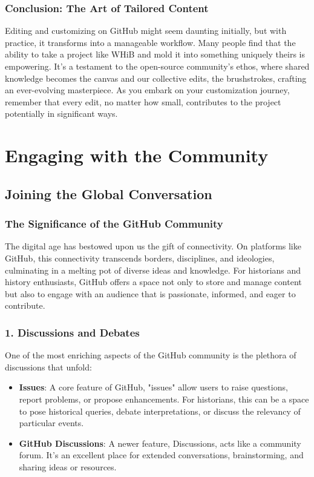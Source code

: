 \documentclass{book}
\begin{document}
\subsection*{Conclusion: The Art of Tailored Content}
Editing and customizing on GitHub might seem daunting initially, but with practice, it transforms into a manageable workflow. Many people find that the ability to take a project like WHiB and mold it into something uniquely theirs is empowering. It's a testament to the open-source community's ethos, where shared knowledge becomes the canvas and our collective edits, the brushstrokes, crafting an ever-evolving masterpiece. As you embark on your customization journey, remember that every edit, no matter how small, contributes to the project potentially in significant ways.

\chapter{Engaging with the Community}
\section*{Joining the Global Conversation}

\subsection*{The Significance of the GitHub Community}
The digital age has bestowed upon us the gift of connectivity. On platforms like GitHub, this connectivity transcends borders, disciplines, and ideologies, culminating in a melting pot of diverse ideas and knowledge. For historians and history enthusiasts, GitHub offers a space not only to store and manage content but also to engage with an audience that is passionate, informed, and eager to contribute.

\subsection*{1. Discussions and Debates}
One of the most enriching aspects of the GitHub community is the plethora of discussions that unfold:

\begin{itemize}
    \item \textbf{Issues}: A core feature of GitHub, "issues" allow users to raise questions, report problems, or propose enhancements. For historians, this can be a space to pose historical queries, debate interpretations, or discuss the relevancy of particular events.
    \item \textbf{GitHub Discussions}: A newer feature, Discussions, acts like a community forum. It's an excellent place for extended conversations, brainstorming, and sharing ideas or resources.
\end{itemize}
\end{document}
